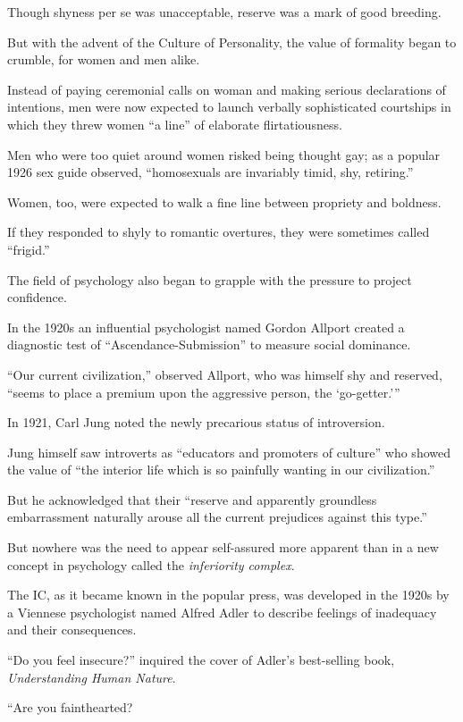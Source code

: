 \documentclass[oneside]{article}
\numberwithin{equation}{section}
\begin{document}
Though shyness per se was unacceptable, reserve was a mark of good breeding.

%
But with the advent of the Culture of Personality, the value of formality began to crumble, for women and men alike.

Instead of paying ceremonial calls on woman and making serious declarations of intentions, men were now expected to launch verbally sophisticated courtships in which they threw women ``a line'' of elaborate flirtatiousness.

Men who were too quiet around women risked being thought gay; as a popular 1926 sex guide observed, ``homosexuals are invariably timid, shy, retiring.''

Women, too, were expected to walk a fine line between propriety and boldness.

If they responded to shyly to romantic overtures, they were sometimes called ``frigid.''

%
The field of psychology also began to grapple with the pressure to project confidence.

In the 1920s an influential psychologist named Gordon Allport created a diagnostic test of ``Ascendance-Submission'' to measure social dominance.

``Our current civilization,'' observed Allport, who was himself shy and reserved, ``seems to place a premium upon the aggressive person, the `go-getter.'''

In 1921, Carl Jung noted the newly precarious status of introversion.

Jung himself saw introverts as ``educators and promoters of culture'' who showed the value of ``the interior life which is so painfully wanting in our civilization.''

But he acknowledged that their ``reserve and apparently groundless embarrassment naturally arouse all the current prejudices against this type.''

%
But nowhere was the need to appear self-assured more apparent than in a new concept in psychology called the \textit{inferiority complex}.

The IC, as it became known in the popular press, was developed in the 1920s by a Viennese psychologist named Alfred Adler to describe feelings of inadequacy and their consequences.

``Do you feel insecure?'' inquired the cover of Adler's best-selling book, \textit{Understanding Human Nature}.

``Are you fainthearted?
\end{document}
